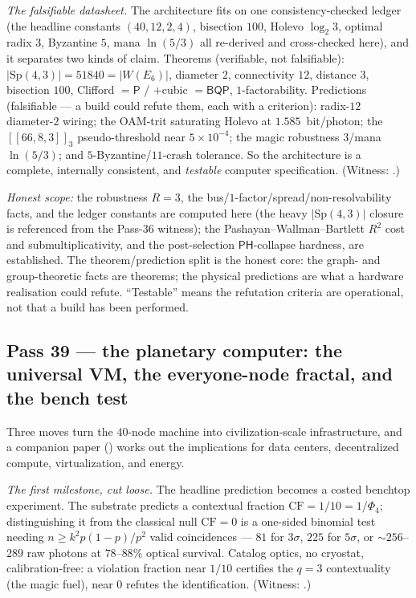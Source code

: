 \documentclass[11pt]{article}
\begin{document}
\emph{The falsifiable datasheet.} The architecture fits on one consistency-checked ledger (the
headline constants $(40,12,2,4)$, bisection $100$, Holevo $\log_2 3$, optimal radix $3$, Byzantine $5$,
mana $\ln(5/3)$ all re-derived and cross-checked here), and it separates two kinds of claim. Theorems
(verifiable, not falsifiable): $|\mathrm{Sp}(4,3)|=51840=|W(E_6)|$, diameter $2$, connectivity $12$,
distance $3$, bisection $100$, Clifford $=\mathsf{P}$ / $+$cubic $=\mathsf{BQP}$, $1$-factorability.
Predictions (falsifiable --- a build could refute them, each with a criterion): radix-$12$ diameter-$2$
wiring; the OAM-trit saturating Holevo at $1.585$~bit/photon; the $[\![66,8,3]\!]_3$ pseudo-threshold
near $5\times10^{-4}$; the magic robustness $3$/mana $\ln(5/3)$; and $5$-Byzantine/$11$-crash
tolerance. So the architecture is a complete, internally consistent, and \emph{testable} computer
specification. (Witness: .)

\emph{Honest scope:} the robustness $R=3$, the bus/$1$-factor/spread/non-resolvability facts, and the
ledger constants are computed here (the heavy $|\mathrm{Sp}(4,3)|$ closure is referenced from the
Pass-36 witness); the Pashayan--Wallman--Bartlett $R^2$ cost and submultiplicativity, and the
post-selection $\mathsf{PH}$-collapse hardness, are established. The theorem/prediction split is the
honest core: the graph- and group-theoretic facts are theorems; the physical predictions are what a
hardware realisation could refute. ``Testable'' means the refutation criteria are operational, not
that a build has been performed.

\subsection{Pass 39 --- the planetary computer: the universal VM, the everyone-node fractal, and the bench test}
\label{sec:capstone-thirtynine}

Three moves turn the $40$-node machine into civilization-scale infrastructure, and a companion paper
() works out the implications for data centers, decentralized
compute, virtualization, and energy.

\emph{The first milestone, cut loose.} The headline prediction becomes a costed benchtop experiment.
The substrate predicts a contextual fraction $\mathrm{CF}=1/10=1/\Phi_4$; distinguishing it from the
classical null $\mathrm{CF}=0$ is a one-sided binomial test needing $n\ge k^2 p(1-p)/p^2$ valid
coincidences --- $81$ for $3\sigma$, $225$ for $5\sigma$, or $\sim256$--$289$ raw photons at
$78$--$88\%$ optical survival. Catalog optics, no cryostat, calibration-free: a violation fraction near
$1/10$ certifies the $q=3$ contextuality (the magic fuel), near $0$ refutes the identification. (Witness:
.)
\end{document}
